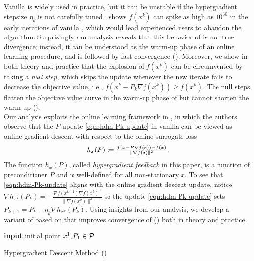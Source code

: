 Vanilla {\hdm} is widely used in practice, but it can be unstable if the hypergradient stepsize $\eta_k$ is not carefully tuned \cite{kunstner2024searching,chandra2022gradient,rubio2017convergence}. 
 shows $f(x^k)$ can spike as high as $10^{30}$ in the early iterations of vanilla {\hdm}, which would lead experienced users to abandon the algorithm. 
Surprisingly, our analysis reveals that this behavior of {\hdm} is not true divergence; instead, it can be understood as the warm-up phase of an online learning procedure, and is followed by fast convergence ().
Moreover, we show in both theory and practice that the explosion of $f(x^k)$ can be circumvented by taking a \emph{null step}, which skips the update whenever the new iterate fails to decrease the objective value, i.e., $f(x^k - P_k \nabla f(x^k)) \geq f(x^k)$.
The null steps flatten the objective value curve in the warm-up phase of {\hdm} but cannot shorten the warm-up ().\\

Our analysis exploits the online learning framework in \cite{gao2024gradient}, in which the authors observe that the $P$-update \eqref{eqn:hdm-Pk-update} in vanilla {\hdm} can be viewed as online gradient descent with respect to the online surrogate loss
\begin{equation} \label{eqn:hypergrad-feedback}
h_x(P) := \tfrac{f ( x - P \nabla f (x) ) - f (x) }{\| \nabla f (x) \|^2}.
\end{equation}
The function $h_x(P)$, called \emph{hypergradient feedback} in this paper, is a function of preconditioner $P$ and is well-defined for all non-stationary $x$. 
To see that \eqref{eqn:hdm-Pk-update} aligns with the online gradient descent update, notice $\nabla h_{x^k}(P_k) = -\tfrac{\nabla f(x^{k+1}) \nabla f(x^k)^{\top}}{\| \nabla f(x^k) \|^2}$ so the update \eqref{eqn:hdm-Pk-update} sets $P_{k+1} = P_k - \eta_k \nabla h_{x^k} (P_k)$.
Using insights from our analysis, we develop a variant of {\hdm} 
based on {\adagrad} that improves convergence of {\hdm} () both in theory and practice. 

\begin{algorithm}[h]
  {\textbf{input} initial point $x^1, P_1 \in \mathcal{P}$}\\
  \caption{Hypergradient Descent Method (\hdm) \label{alg:hdm}}
\end{algorithm}

